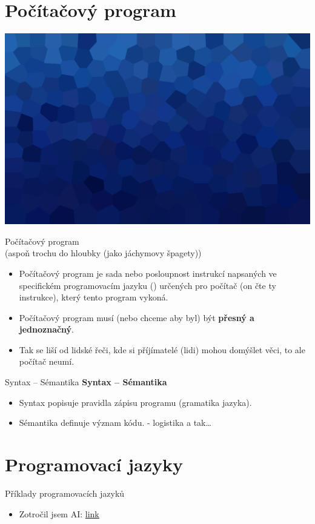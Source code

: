 \documentclass[aspectratio=169,xcolor=dvipsnames, t]{beamer}
\begin{document}
\section{Počítačový program}
{
{
    \includegraphics[width=\paperwidth,height=\paperheight]{AICStyleData/logos/mene_polygonu_bg.png}
}
\begin{frame}{Počítačový program \\(aspoň trochu do hloubky (jako jáchymovy špagety))}
    \begin{itemize}
        \item Počítačový program je sada nebo posloupnost instrukcí napsaných ve specifickém programovacím jazyku () určených pro počítač (on čte ty instrukce), který tento program vykoná.   
        \item Počítačový program musí (nebo chceme aby byl) být \textbf{přesný a jednoznačný}.
        \item Tak se liší od lidské řeči, kde si příjímatelé (lidi) mohou domýšlet věci, to ale počítač neumí. 
    \end{itemize}
\end{frame}

\begin{frame}{Syntax -- Sémantika}
    \textbf{Syntax -- Sémantika}
    \begin{itemize}
        \item Syntax popisuje pravidla zápisu programu (gramatika jazyka).
        \item Sémantika definuje význam kódu. - logistika a tak\ldots
    \end{itemize}
\end{frame}

\section{Programovací jazyky}
\begin{frame}{Příklady programovacích jazyků}
    \begin{itemize}
        \item Zotročil jsem AI: \href{https://chatgpt.com/share/67c75c2c-c014-800b-a533-57120d2b885b}{link}
    \end{itemize}
\end{frame}

}
\end{document}
